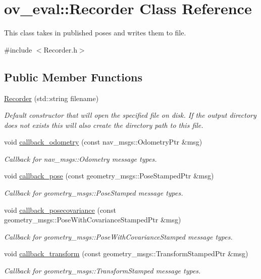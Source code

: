 \hypertarget{classov__eval_1_1Recorder}{}\section{ov\+\_\+eval\+:\+:Recorder Class Reference}
\label{classov__eval_1_1Recorder}


This class takes in published poses and writes them to file.  




{\ttfamily \#include $<$Recorder.\+h$>$}

\subsection*{Public Member Functions}
\begin{DoxyCompactItemize}
\item 
\hyperlink{classov__eval_1_1Recorder_a36307659369029395731737a7577bf0a}{Recorder} (std\+::string filename)
\begin{DoxyCompactList}\small\item\em Default constructor that will open the specified file on disk. If the output directory does not exists this will also create the directory path to this file. \end{DoxyCompactList}\item 
void \hyperlink{classov__eval_1_1Recorder_a731eae3cf076afc70a7e590f5e8943fe}{callback\+\_\+odometry} (const nav\+\_\+msgs\+::\+Odometry\+Ptr \&msg)
\begin{DoxyCompactList}\small\item\em Callback for nav\+\_\+msgs\+::\+Odometry message types. \end{DoxyCompactList}\item 
void \hyperlink{classov__eval_1_1Recorder_a0a2cc6684a70ab530c8d7c31ebc1ba9e}{callback\+\_\+pose} (const geometry\+\_\+msgs\+::\+Pose\+Stamped\+Ptr \&msg)
\begin{DoxyCompactList}\small\item\em Callback for geometry\+\_\+msgs\+::\+Pose\+Stamped message types. \end{DoxyCompactList}\item 
void \hyperlink{classov__eval_1_1Recorder_afe156131ed31a4f35d7fea30d4221293}{callback\+\_\+posecovariance} (const geometry\+\_\+msgs\+::\+Pose\+With\+Covariance\+Stamped\+Ptr \&msg)
\begin{DoxyCompactList}\small\item\em Callback for geometry\+\_\+msgs\+::\+Pose\+With\+Covariance\+Stamped message types. \end{DoxyCompactList}\item 
void \hyperlink{classov__eval_1_1Recorder_aa98f2bf8b8f3bfc70c905d83a778065b}{callback\+\_\+transform} (const geometry\+\_\+msgs\+::\+Transform\+Stamped\+Ptr \&msg)
\begin{DoxyCompactList}\small\item\em Callback for geometry\+\_\+msgs\+::\+Transform\+Stamped message types. \end{DoxyCompactList}\end{DoxyCompactItemize}
